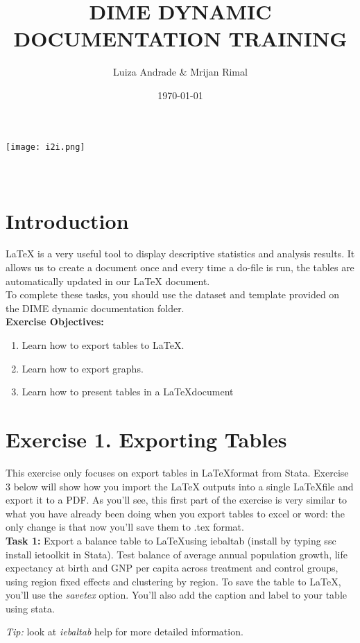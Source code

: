 \documentclass[12pts]{report}
\title{DIME DYNAMIC DOCUMENTATION TRAINING }
\author{Luiza Andrade \& Mrijan Rimal}
\date{\today}
\begin{document}
	

\makeatletter
\begin{titlepage}
	\begin{center}
		\texttt{[image: i2i.png]}\\[10ex]
		{\LARGE \bfseries  \@title }\\[2ex] 
		{\Large  \@author}\\[20ex] 
		{\large \@date}
	\end{center}
\end{titlepage}
\makeatother

\section*{Introduction}
LaTeX is a very useful tool to display descriptive statistics and analysis results. It allows us to create a document once and every time a do-file is run, the tables are automatically updated in our LaTeX document. \\

To complete these tasks, you should use the dataset and template provided on the DIME dynamic documentation folder. \\

\textbf{Exercise Objectives:}
\begin{enumerate}
	\item Learn how to export tables to \LaTeX.
	\item Learn how to export graphs.
	\item Learn how to present tables in a \LaTeX document
\end{enumerate}

\section*{Exercise 1. Exporting Tables}
This exercise only focuses on export tables in \LaTeX \space format from Stata. Exercise 3 below will show how you import the LaTeX outputs into a single \LaTeX \space file and export it to a PDF. As you'll see, this first part of the exercise is very similar to what you have already been doing when you export tables to excel or word: the only change is that now you'll save them to .tex format. \\

\textbf{Task 1:}  Export a balance table to \LaTeX \space using iebaltab (install by typing ssc install ietoolkit in Stata). Test balance of average annual population growth, life expectancy at birth and GNP per capita across treatment and control groups, using region fixed effects and clustering by region. To save the table to \LaTeX, you'll use the \textit{savetex} option. You'll also add the caption and label to your table using stata. 
\begin{center}
	\colorbox{BurntOrange}{\emph{Tip:} look at \textit{iebaltab} help for more detailed information.}
\end{center}
\end{document}
